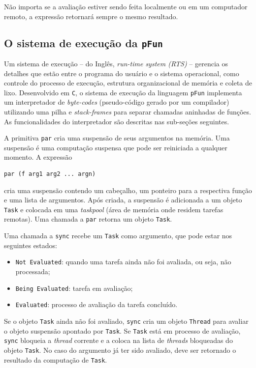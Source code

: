 \documentclass[ccc, pg2]{esinucpel}
\begin{document}
Não importa se a avaliação estiver sendo feita localmente ou em um computador remoto, a expressão retornará sempre o mesmo resultado.

\subsection{O sistema de execução da \texttt{pFun}}
Um sistema de execução -- do Inglês, {\it run-time system (RTS)} -- gerencia os detalhes que estão entre o programa do usuário e o sistema operacional, como controle do processo de execução, estrutura organizacional de memória e coleta de lixo. Desenvolvido em \texttt{C}, o sistema de execução da linguagem \texttt{pFun} implementa um interpretador de {\it byte-codes} (pseudo-código gerado por um compilador) utilizando uma pilha e \textit{stack-frames} para separar chamadas aninhadas de funções. As funcionalidades do interpretador são descritas nas sub-seções seguintes.

A primitiva {\tt par} cria uma suspensão de seus argumentos na memória. Uma suspensão é uma computação suspensa que pode ser reiniciada a qualquer momento. A expressão
\begin{verbatim}
par (f arg1 arg2 ... argn)
\end{verbatim}

\noindent cria uma suspensão contendo um cabeçalho, um ponteiro para a respectiva função e uma lista de argumentos. Após criada, a suspensão é adicionada a um objeto \texttt{Task} e colocada em uma {\it taskpool} (área de memória onde residem tarefas remotas). Uma chamada a \texttt{par} retorna um objeto \texttt{Task}.%

Uma chamada a \texttt{sync} recebe um \texttt{Task} como argumento, que pode estar nos seguintes estados:
\begin{itemize}
\item \texttt{Not Evaluated}: quando uma tarefa ainda não foi avaliada, ou seja, não processada;
\item \texttt{Being Evaluated}: tarefa em avaliação;
\item \texttt{Evaluated}: processo de avaliação da tarefa concluído.
\end{itemize}

Se o objeto \texttt{Task} ainda não foi avaliado, \texttt{sync} cria um objeto {\tt Thread} para avaliar o objeto suspensão apontado por \texttt{Task}. Se \texttt{Task} está em processo de avaliação, \texttt{sync} bloqueia a \textit{thread} corrente e a coloca na lista de {\it threads} bloqueadas do objeto \texttt{Task}. No caso do argumento já ter sido avaliado, deve ser retornado o resultado da computação de \texttt{Task}. 
\end{document}
